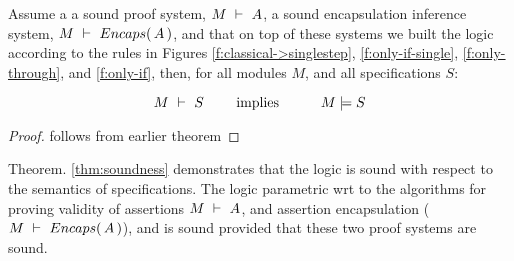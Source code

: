 \begin{theorem}[Soundness]
\label{thm:soundness}
Assume a a sound \SpecO proof system, $M\ \vdash\ A$, 
a sound encapsulation inference system, $M\ \vdash\ {Encaps(\, A\, )}$,
 and  that on top of these systems we built
 the \SpecLang logic according to the rules in Figures \ref{f:classical->singlestep},  \ref{f:only-if-single}, 
 \ref{f:only-through},  and \ref{f:only-if},   then, for    all modules $M$, and all \SpecLang specifications  $S$:
 
 $$\proves{M}{S}\ \ \ \ \ \ \ \mbox{implies}\ \ \ \ \ \  \ \ \ \satisfies{M}{S}$$
\end{theorem}

\begin{proof}
follows from earlier theorem
\end{proof}
 


Theorem. \ref{thm:soundness} demonstrates 
 that the   \SpecLang logic is sound with respect to the semantics of \SpecLang specifications.
 The \SpecLang logic parametric wrt to the algorithms for proving validity of assertions
 $M\ \vdash\ A$, and 
 assertion encapsulation ($M\ \vdash\ {Encaps(\, A\, )}$), and is sound
 provided that these two proof systems are sound.

